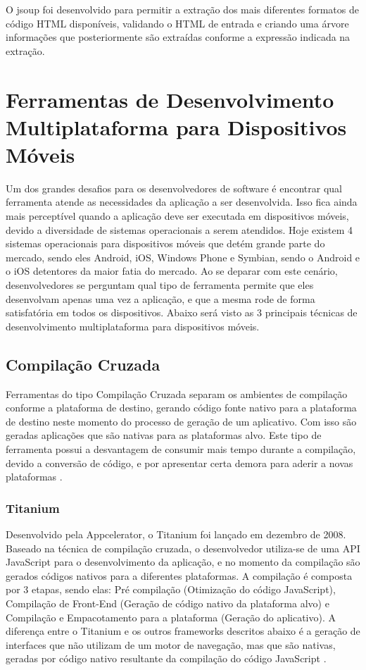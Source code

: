 O jsoup foi desenvolvido para permitir a extração dos mais diferentes formatos de código HTML disponíveis, validando o HTML de entrada e criando uma árvore informações que posteriormente são extraídas conforme a expressão indicada na extração\cite{JSOUP}.

\chapter{Ferramentas de Desenvolvimento Multiplataforma para Dispositivos Móveis}
Um dos grandes desafios para os desenvolvedores de software é encontrar qual ferramenta atende as necessidades da aplicação a ser desenvolvida. Isso fica ainda mais perceptível quando a aplicação deve ser executada em dispositivos móveis, devido a diversidade de sistemas operacionais a serem atendidos. Hoje existem 4 sistemas operacionais para dispositivos móveis que detém grande parte do mercado, sendo eles Android, iOS, Windows Phone e Symbian, sendo o Android e o iOS detentores da maior fatia do mercado. Ao se deparar com este cenário, desenvolvedores se perguntam qual tipo de ferramenta permite que eles desenvolvam apenas uma vez a aplicação, e que a mesma rode de forma satisfatória em todos os dispositivos. Abaixo será visto as 3 principais técnicas de desenvolvimento multiplataforma para dispositivos móveis\cite{CrossPlatformMobileDevelopment2011}.

\section{Compilação Cruzada}
Ferramentas do tipo Compilação Cruzada separam os ambientes de compilação conforme a plataforma de destino, gerando código fonte nativo para a plataforma de destino neste momento do processo de geração de um aplicativo. Com isso são geradas aplicações que são nativas para as plataformas alvo. Este tipo de ferramenta possui a desvantagem de consumir mais tempo durante a compilação, devido a conversão de código, e por apresentar certa demora para aderir a novas plataformas
\cite{CrossPlatformMobileDevelopment2011}.

\subsection{Titanium}
Desenvolvido pela Appcelerator, o Titanium foi lançado em dezembro de 2008. Baseado na técnica de compilação cruzada, o desenvolvedor utiliza-se de uma API JavaScript para o desenvolvimento da aplicação, e no momento da compilação são gerados códigos nativos para a diferentes plataformas. A compilação é composta por 3 etapas, sendo elas: Pré compilação (Otimização do código JavaScript), Compilação de Front-End (Geração de código nativo da plataforma alvo) e Compilação e Empacotamento para a plataforma (Geração do aplicativo). A diferença entre o Titanium e os outros frameworks descritos abaixo é a geração de interfaces que não utilizam de um motor de navegação, mas que são nativas, geradas por código nativo resultante da compilação do código JavaScript
\cite{CrossPlatformMobileDevelopment2011}.

